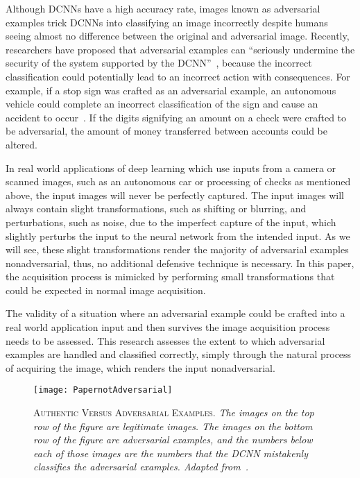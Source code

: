 \documentclass[conference]{IEEEtran}
\renewcommand\cap[3]{\caption[#2]{\label{#1}\textsc{#2}. \small\textit{#3}}}
\begin{document}
Although DCNNs have a high accuracy rate, images known as adversarial examples trick DCNNs into classifying an image incorrectly despite humans seeing almost no difference between the original and adversarial image.  Recently, researchers have proposed that adversarial examples can ``seriously undermine the security of the system supported by the DCNN''~\cite{c3}, because the incorrect classification could potentially lead to an incorrect action with consequences.  For example, if a stop sign was crafted as an adversarial example, an autonomous vehicle could complete an incorrect classification of the sign and cause an accident to occur~\cite{c12}. If the digits signifying an amount on a check were crafted to be adversarial, the amount of money transferred between accounts could be altered.

In real world applications of deep learning which use inputs from a camera or scanned images, such as an autonomous car or processing of checks as mentioned above, the input images will never be perfectly captured.  The input images will always contain slight transformations, such as shifting or blurring, and perturbations, such as noise, due to the imperfect capture of the input, which slightly perturbs the input to the neural network from the intended input.  As we will see, these slight transformations render the majority of adversarial examples nonadversarial, thus, no additional defensive technique is necessary.  In this paper, the acquisition process is mimicked by performing small transformations that could be expected in normal image acquisition.

The validity of a situation where an adversarial example could be crafted into a real world application input and then survives the image acquisition process needs to be assessed. This research assesses the extent to which adversarial examples are handled and classified correctly, simply through the natural process of acquiring the image, which renders the input nonadversarial.

\begin{figure}
\vspace{0.05cm}
\centering
\texttt{[image: PapernotAdversarial]}
\cap{fig:examples}{Authentic Versus Adversarial Examples}{The images on the top row of the figure are legitimate images.  The images on the bottom row of the figure are adversarial examples, and the numbers below each of those images are the numbers that the DCNN mistakenly classifies the adversarial examples.  Adapted from~\cite{c3}.}
\vspace{-0.05cm}

\end{figure}
\end{document}

